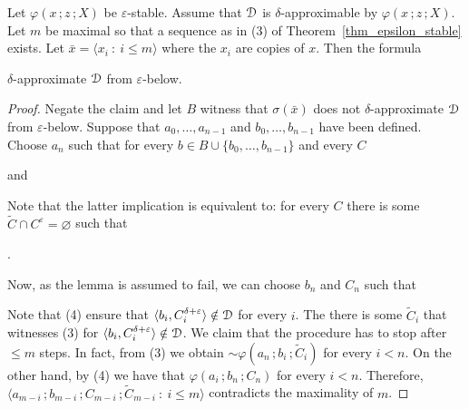 \begin{lemma}
  Let $\varphi(x\,;z\,;X)$ be $\varepsilon$-stable.
  Assume that ${\EuScript D}$ is $\delta$-approximable by $\varphi(x\,;z\,;X)$.
  Let $m$ be maximal so that a sequence as in (3) of Theorem~\ref{thm_epsilon_stable} exists.
  Let $\bar x=\langle x_i\ :\ i\le m\rangle$ where the $x_i$ are copies of $x$.
  Then the formula\smallskip

  \smallskip

  $\delta$-approximate ${\EuScript D}$ from $\varepsilon$-below.
\end{lemma}

\begin{proof}
  Negate the claim and let $B$ witness that $\sigma(\bar x)$ does not $\delta$-approximate ${\EuScript D}$ from $\varepsilon$-below.
  Suppose that $a_0,\dots,a_{n-1}$ and $b_0,\dots,b_{n-1}$ have been defined.
  Choose $a_n$ such that for every $b\in B\cup\{b_0,\dots,b_{n-1}\}$ and every $C$

  \quad and

  
  Note that the latter implication is equivalent to: for every $C$ there is some  $\tilde C\cap C^\varepsilon=\varnothing$ such that 
  
  .%

  Now, as the lemma is assumed to fail, we can choose $b_n$ and $C_n$ such that


  Note that (4) ensure that $\langle b_i,C_i^{\delta+\varepsilon}\rangle\notin{\EuScript D}$ for every $i$.
  The there is some $\tilde C_i$ that witnesses (3) for $\langle b_i,C_i^{\delta+\varepsilon}\rangle\notin{\EuScript D}$.
  We claim that the procedure has to stop after $\le m$ steps. 
  In fact, from (3) we obtain ${\sim}\varphi(a_n\,;b_i\,;\tilde C_i)$ for every $i<n$.
  On the other hand, by (4) we have that $\varphi(a_i\,;b_n\,;C_n)$ for every $i<n$.
  Therefore, $\langle a_{m-i}\,;b_{m-i}\,;C_{m-i}\,;\tilde C_{m-i}\ :\ i\le m\rangle$ contradicts the maximality of $m$.
\end{proof}
